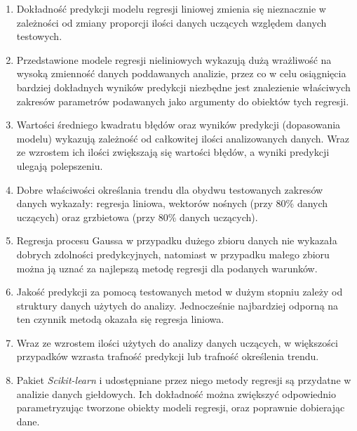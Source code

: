 \begin{enumerate}
 \item Dokładność predykcji modelu regresji liniowej zmienia się nieznacznie w zależności od zmiany proporcji ilości danych uczących względem danych testowych.\\
 \item Przedstawione modele regresji nieliniowych wykazują dużą wrażliwość na wysoką zmienność danych poddawanych analizie, przez co w celu osiągnięcia bardziej dokładnych wyników predykcji niezbędne jest znalezienie właściwych zakresów parametrów podawanych jako argumenty do obiektów tych regresji.\\
 \item Wartości średniego kwadratu błędów oraz wyników predykcji (dopasowania modelu) wykazują zależność od całkowitej ilości analizowanych danych. Wraz ze wzrostem ich ilości zwiększają się wartości błędów, a wyniki predykcji ulegają polepszeniu.\\
 \item Dobre właściwości określania trendu dla obydwu testowanych zakresów danych wykazały: regresja liniowa, wektorów nośnych (przy 80\% danych uczących) oraz grzbietowa (przy 80\% danych uczących).\\
 \item Regresja procesu Gaussa w przypadku dużego zbioru danych nie wykazała dobrych zdolności predykcyjnych, natomiast w przypadku małego zbioru można ją uznać za najlepszą metodę regresji dla podanych warunków.\\
 \item Jakość predykcji za pomocą testowanych metod w dużym stopniu zależy od struktury danych użytych do analizy. Jednocześnie najbardziej odporną na ten czynnik metodą okazała się regresja liniowa.\\
 \item Wraz ze wzrostem ilości użytych do analizy danych uczących, w większości przypadków wzrasta trafność predykcji lub trafność określenia trendu.\\
 \item Pakiet \textit{Scikit-learn} i udostępniane przez niego metody regresji są przydatne w analizie danych giełdowych. Ich dokładność można zwiększyć odpowiednio parametryzując tworzone obiekty modeli regresji, oraz poprawnie dobierając dane.\\
\end{enumerate}

